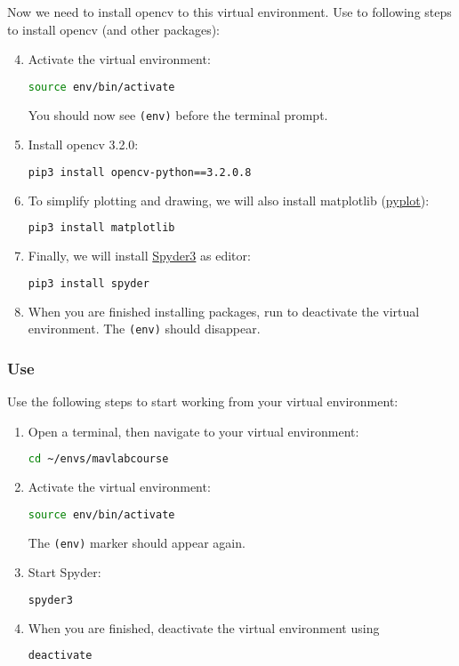 \documentclass{article}
\begin{document}
Now we need to install opencv to this virtual environment. Use to following steps to install opencv (and other packages):
\begin{enumerate}\setcounter{enumi}{3}
\item Activate the virtual environment:
\begin{lstlisting}[language=bash]
source env/bin/activate
\end{lstlisting}
You should now see \texttt{(env)} before the terminal prompt.
\item Install opencv 3.2.0:
\begin{lstlisting}[language=bash]
pip3 install opencv-python==3.2.0.8
\end{lstlisting}
\item To simplify plotting and drawing, we will also install matplotlib (\href{https://matplotlib.org/api/pyplot_api.html}{pyplot}):
\begin{lstlisting}[language=bash]
pip3 install matplotlib
\end{lstlisting}
\item Finally, we will install \href{https://docs.spyder-ide.org/index.html}{Spyder3} as editor:
\begin{lstlisting}[language=bash]
pip3 install spyder
\end{lstlisting}
\item When you are finished installing packages, run  to deactivate the virtual environment. The \texttt{(env)} should disappear.
\end{enumerate}

\subsubsection{Use}
Use the following steps to start working from your virtual environment:
\begin{enumerate}
\item Open a terminal, then navigate to your virtual environment:
\begin{lstlisting}[language=bash]
cd ~/envs/mavlabcourse
\end{lstlisting}
\item Activate the virtual environment:
\begin{lstlisting}[language=bash]
source env/bin/activate
\end{lstlisting}
The \texttt{(env)} marker should appear again.
\item Start Spyder:
\begin{lstlisting}[language=bash]
spyder3
\end{lstlisting}
\item When you are finished, deactivate the virtual environment using
\begin{lstlisting}[language=bash]
deactivate
\end{lstlisting}
\end{enumerate}
\end{document}
